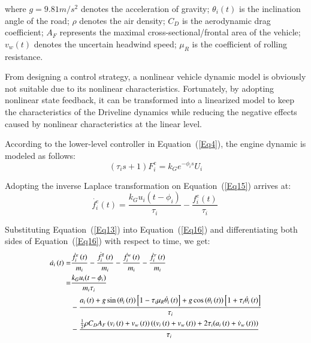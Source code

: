 \documentclass[journal]{IEEEtran}
\begin{document}
where $g=9.81m/s^2$ denotes the acceleration of gravity; $\theta_i(t)$ is the inclination angle of the road; $\rho$ denotes the air density; $C_D$ is the aerodynamic drag coefficient; $A_F$ represents the maximal cross-sectional/frontal area of the vehicle; $v_w(t)$ denotes the uncertain headwind speed; $\mu_R$ is the coefficient of rolling resistance.

From designing a control strategy, a nonlinear vehicle dynamic model is obviously not suitable due to its nonlinear characteristics. Fortunately, by adopting nonlinear state feedback, it can be transformed into a linearized model to keep the characteristics of the Driveline dynamics while reducing the negative effects caused by nonlinear characteristics at the linear level.

According to the lower-level controller in Equation~(\ref{Eq4}), the engine dynamic is modeled as follows:
\begin{equation}
  \left(\tau_is+1\right)F_i^e=k_Ge^{-\phi_is}U_i
  \label{Eq15}
\end{equation}


Adopting the inverse Laplace transformation on Equation~(\ref{Eq15}) arrives at:
\begin{equation}
  \dot{f_i^e}\left(t\right)=\frac{k_Gu_i(t-\phi_i)}{\tau_i}-\frac{f_i^e\left(t\right)}{\tau_i}\
  \label{Eq16}
\end{equation}

Substituting Equation~(\ref{Eq13}) into Equation~(\ref{Eq16}) and differentiating both sides of Equation~(\ref{Eq16}) with respect to time, we get:
\begin{equation}
  \begin{small}
    \begin{aligned}
      \dot{a_i}\left(t\right)  =&\frac{\dot{f_i^e}\left(t\right)}{m_i}-\frac{\dot{f_i^g}\left(t\right)}{m_i}-\frac{\dot{f_i^w}\left(t\right)}{m_i}-\frac{\dot{f_i^r}\left(t\right)}{m_i}                                                       \\
                               =&\frac{k_Gu_i(t-\phi_i)}{{m_i\tau}_i}                                                                                                                                                                          \\&-\frac{a_i\left(t\right)+g\sin{\left(\theta_i\left(t\right)\right)}\left[1-\tau_i\mu_R\dot{\theta_i}\left(t\right)\right]+g\cos{\left(\theta_i\left(t\right)\right)}\left[1+\tau_i\dot{\theta_i}\left(t\right)\right]}{\tau_i} \\
                              &  -\frac{\frac{1}{2}\rho C_DA_F\left(v_i\left(t\right)+v_w\left(t\right)\right)\left(\left(v_i\left(t\right)+v_w\left(t\right)\right)+2\tau_i(a_i\left(t\right)+\dot{v}_{w}\left(t\right))\right)}{\tau_i}
    \end{aligned}
    \label{Eq17}
  \end{small}
\end{equation}
\end{document}
